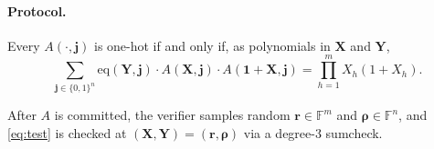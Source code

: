 \documentclass[11pt]{article}
\newcommand{\F}{\mathbb{F}}
\newcommand{\eq}{\mathrm{eq}}
\newcommand{\vj}{\mathbf{j}}
\newcommand{\vr}{\mathbf{r}}
\newcommand{\vx}{\mathbf{X}}
\newcommand{\vone}{\mathbf{1}}
\newcommand{\vrho}{\boldsymbol{\rho}}
\begin{document}
\paragraph{Protocol.} Every $A(\cdot, \vj)$ is one-hot if and only if, as polynomials in $\vx$ and $\mathbf{Y}$,
\begin{equation}\label{eq:test}
\sum_{\vj \in \{0,1\}^n} \eq(\mathbf{Y}, \vj) \cdot A(\vx, \vj) \cdot A(\vone + \vx, \vj) = \prod_{h=1}^m X_h(1 + X_h) .
\end{equation}

After $A$ is committed, the verifier samples random $\vr \in \F^m$ and $\vrho \in \F^n$, and \eqref{eq:test} is checked at $(\vx, \mathbf{Y}) = (\vr, \vrho)$ via a degree-3 sumcheck.
\end{document}
